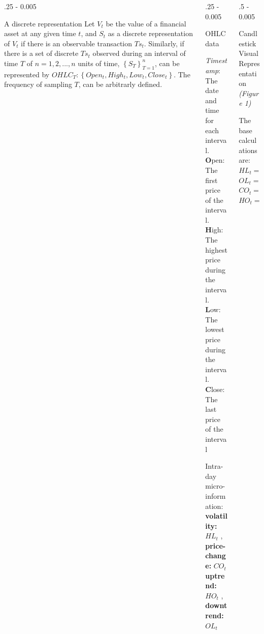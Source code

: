\documentclass{postertheme}\usepackage[]{graphicx}\usepackage[]{color}
\begin{document}
\begin{frame}
\begin{columns}[onlytextwidth]
\begin{column}{.25 \textwidth - 0.005 \textwidth}
\begin{block}{A discrete representation}
      Let $V_{t}$ be the value of a financial asset at any given time $t$, and $S_{t}$ as a discrete 
      representation of $V_{t}$ if there is an observable transaction $Ts_{t}$. Similarly, if there is 
      a set of discrete $Ts_{t}$ observed during an interval of time $T$ of $n = 1, 2, ... , n$ units of time, 
      $\left\{ S_{T} \right\}_{T=1}^{n}$, can be represented by
      $OHLC_{T}: \left\{ Open_{t}, High_{t}, Low_{t}, Close_{t} \right\}$. The frequency of sampling $T$,
      can be arbitrarly defined. 
      
    \end{block}
  \end{column}
  
  \begin{column}{.25 \textwidth - 0.005 \textwidth}
  \begin{block}{OHLC data} \footnotesize
  
      \textit{Timestamp}: The date and time for each interval. \\
      \textbf{O}pen: The first price of the interval. \\
      \textbf{H}igh: The highest price during the interval. \\
      \textbf{L}ow: The lowest price during the interval. \\
      \textbf{C}lose: The last price of the interval

      Intra-day micro-information: \\
     \textbf{volatility:}  $HL_{t}$ , \textbf{price-change:} $ CO_{t}$ \\
     \textbf{uptrend:} $HO_{t}$ , \textbf{downtrend:} $ OL_{t}$

  \end{block}
  \end{column}

  \begin{column}{.5 \textwidth - 0.005 \textwidth}
    \begin{block}{Candlestick Visual Representation \footnotesize \textit{(Figure 1)}} 
    
    \begin{minipage}[h]{0.25 \textwidth} \footnotesize
      
      The base calculations are: \\
      
      $HL_{t} = High_{t} - Low_{t}$ \\
      $OL_{t} = Open_{t} - Low_{t}$ \\
      $CO_{t} = Close_{t} - Open_{t}$ \\
      $HO_{t} = High_{t} - Open_{t}$
    

\end{minipage}
\end{block}
\end{column}
\end{columns}
\end{frame}
\end{document}
